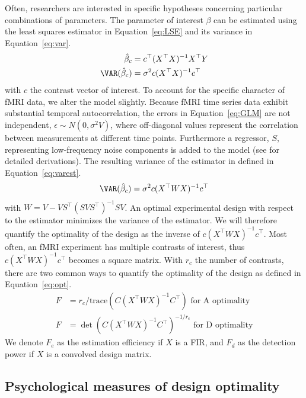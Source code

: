 \documentclass[article]{jss}
\begin{document}
Often, researchers are interested in specific hypotheses concerning
particular combinations of parameters.  The parameter of interest
$\beta$ can be estimated using the least squares estimator in
Equation~\ref{eq:LSE} and its variance in Equation~\ref{eq:var}.%
\begin{align}
\hat\beta_c &= c^\top(X^\top X)^{-1}X^\top Y \label{eq:LSE}\\
\VAR(\hat\beta_c) &= \sigma^2c(X^\top X)^{-1}c^\top \label{eq:var}
\end{align}
with $c$ the contrast vector of interest.  To account for the specific
character of fMRI data, we alter the model slightly.  Because fMRI
time series data exhibit substantial temporal autocorrelation, the
errors in Equation~\ref{eq:GLM} are not independent, $\epsilon \sim N(0, \sigma^2V)$,
where off-diagonal values represent the correlation between
measurements at different time points.  Furthermore a regressor, $S$,
representing low-frequency noise components is added to the model (see
\citealt{Kao2009-yo} for detailed derivations).  The resulting
variance of the estimator in defined in Equation~\ref{eq:varest}.
%
\begin{equation} \label{eq:varest}
\VAR(\hat\beta_c) = \sigma^2c(X^\top WX)^{-1}c^\top
\end{equation}
%
with $W = V-VS^\top(SVS^\top)^{-1}SV$.  An optimal experimental design with respect to the estimator minimizes the variance of the estimator. We will therefore quantify the optimality of the design as the inverse of $c(X^\top WX)^{-1}c^\top$.  Most often, an fMRI experiment has multiple contrasts of interest,  thus $c(X^\top WX)^{-1}c^\top$ becomes a square matrix.  With $r_c$ the number of contrasts, there are two common ways to quantify the optimality of the design as defined in Equation~\ref{eq:opt}.
\begin{equation}%
\begin{aligned}\label{eq:opt}
F &= r_c/\text{trace}(C(X^\top WX)^{-1}C^\top)  \text{ for A optimality} \\
F &= \det(C(X^\top WX)^{-1}C^\top)^{-1/r_c} \text{ for D optimality}
\end{aligned}
\end{equation}
%
We denote $F_e$ as the estimation efficiency if $X$ is a FIR, and $F_d$ as the detection power if $X$ is a convolved design matrix.

\subsection{Psychological measures of design optimality}
\end{document}
